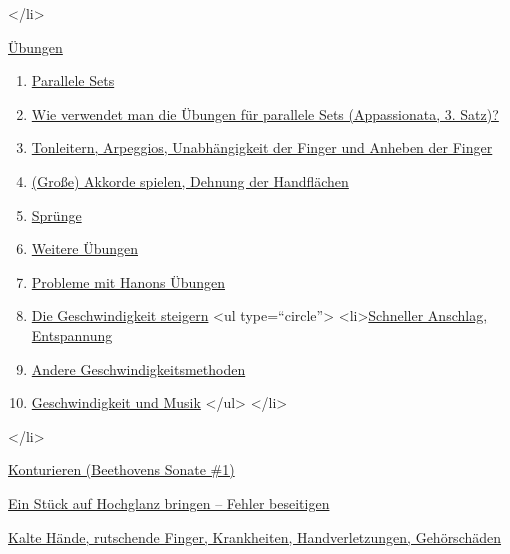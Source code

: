  </li>
 \item \hyperref[c1iii7]{Übungen}
  \begin{enumerate}[label={\alph*.}] 
   <li>\hyperref[c1iii7a]{Einführung}
    <ul type=\enquote{circle}>
      <li>\hyperref[c1iii7aMuskeln]{Schnelle und langsame Muskeln}
    </ul>
   </li> 
   \item \hyperref[c1iii7b]{Parallele Sets}
   \item \hyperref[c1iii7c]{Wie verwendet man die Übungen für parallele Sets (Appassionata, 3. Satz)?}
   \item \hyperref[c1iii7d]{Tonleitern, Arpeggios, Unabhängigkeit der Finger und Anheben der Finger}
   \item \hyperref[c1iii7e]{(Große) Akkorde spielen, Dehnung der Handflächen}
   \item \hyperref[c1iii7f]{Sprünge}
   \item \hyperref[c1iii7g]{Weitere Übungen}
   \item \hyperref[c1iii7h]{Probleme mit Hanons Übungen}
   \item \hyperref[c1iii7i]{Die Geschwindigkeit steigern}
    <ul type=\enquote{circle}>
     <li>\hyperref[c1iii7iAnschlag]{Schneller Anschlag, Entspannung}
     \item \hyperref[c1iii7iAndere]{Andere Geschwindigkeitsmethoden}
     \item \hyperref[c1iii7iMusik]{Geschwindigkeit und Musik}
    </ul>
   </li>
   \end{enumerate}
 </li>
 \item \hyperref[c1iii8]{Konturieren (Beethovens Sonate \#1)}
 \item \hyperref[c1iii9]{Ein Stück auf Hochglanz bringen -- Fehler beseitigen}
 \item \hyperref[c1iii10]{Kalte Hände, rutschende Finger, Krankheiten, Handverletzungen, Gehörschäden}
